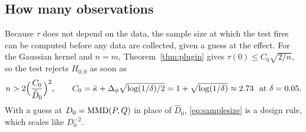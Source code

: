 \subsection{How many observations}
\label{sec:samplesize}

Because $\tau$ does not depend on the data, the sample size at which the test fires can be computed before any data
are collected, given a guess at the effect. For the Gaussian kernel and $n=m$, Theorem~\ref{thm:plugin} gives
$\tau(0)\le C_0\sqrt{2/n}$, so the test rejects $H_{0,0}$ as soon as
\begin{equation}
n>2\Big(\frac{C_0}{\widehat D_0}\Big)^2,
\qquad
C_0=\bar\kappa+\Delta_\phi\sqrt{\log(1/\delta)/2}=1+\sqrt{\log(1/\delta)}\approx2.73
\ \text{ at }\delta=0.05 .
\label{eq:samplesize}
\end{equation}
With a guess at $D_0=\operatorname{MMD}(P,Q)$ in place of $\widehat D_0$, \eqref{eq:samplesize} is a design rule, which scales like
$D_0^{-2}$.
